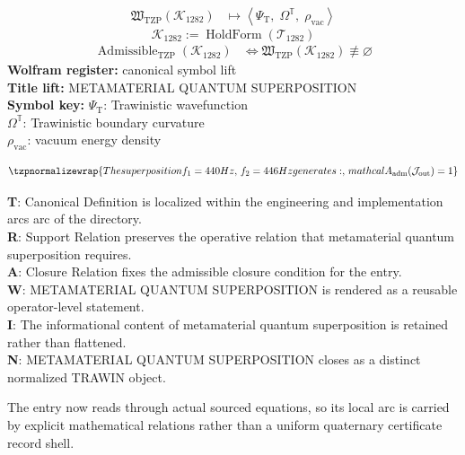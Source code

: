 \noindent
\begin{minipage}[t]{0.48\linewidth}
\begingroup
\small
\[
\begin{aligned}
\mathfrak{W}_{\mathrm{TZP}}\!\left(\mathcal{K}_{1282}\right)
&\longmapsto
\left\langle \Psi_{\mathrm{T}},\; \Omega^{\mathbb{T}},\; \rho_{\mathrm{vac}} \right\rangle
\end{aligned}
\]
\[
\mathcal{K}_{1282}
:=
\operatorname{HoldForm}\!\left(\mathcal{T}_{1282}\right)
\]
\[
\begin{aligned}
\operatorname{Admissible}_{\mathrm{TZP}}\!\left(\mathcal{K}_{1282}\right)
&\Longleftrightarrow
\mathfrak{W}_{\mathrm{TZP}}\!\left(\mathcal{K}_{1282}\right)\not\equiv\varnothing
\end{aligned}
\]
\textbf{Wolfram register:} canonical symbol lift\\
\textbf{Title lift:} METAMATERIAL QUANTUM SUPERPOSITION\\
\textbf{Symbol key:} \(\Psi_{\mathrm{T}}\): Trawinistic wavefunction\\ \(\Omega^{\mathbb{T}}\): Trawinistic boundary curvature\\ \(\rho_{\mathrm{vac}}\): vacuum energy density
\par
\endgroup
\end{minipage}\hfill
\begin{minipage}[t]{0.48\linewidth}
\[
\tzpnormalizewrap{The superposition f_1 = 440 Hz,\,f_2 = 446 Hz generates:,\,mathcal{A}_{\mathrm{adm}}\!\left(\mathcal{J}_{\mathrm{out}}\right)=1}
\]

\small
\textbf{T}: Canonical Definition is localized within the engineering and implementation arcs arc of the directory.\\
\textbf{R}: Support Relation preserves the operative relation that metamaterial quantum superposition requires.\\
\textbf{A}: Closure Relation fixes the admissible closure condition for the entry.\\
\textbf{W}: METAMATERIAL QUANTUM SUPERPOSITION is rendered as a reusable operator-level statement.\\
\textbf{I}: The informational content of metamaterial quantum superposition is retained rather than flattened.\\
\textbf{N}: METAMATERIAL QUANTUM SUPERPOSITION closes as a distinct normalized TRAWIN object.
\normalsize
\end{minipage}

The entry now reads through actual sourced equations, so its local arc is carried by explicit mathematical relations rather than a uniform quaternary certificate record shell.
\clearpage

